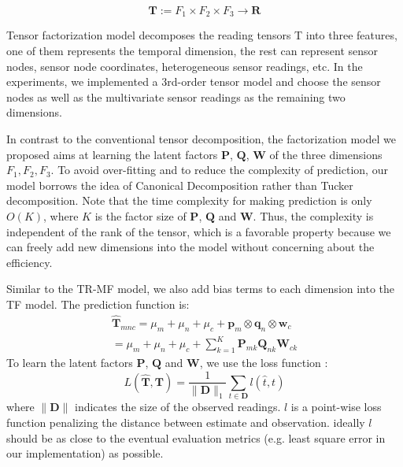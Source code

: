 \begin{equation*}
\mathbf{T} := F_1 \times  F_2 \times F_3 \rightarrow \mathbf{R} 
\end{equation*}

Tensor factorization model decomposes the reading tensors T into three features, one of them represents the temporal dimension, the rest can represent sensor nodes, sensor node coordinates, heterogeneous sensor readings, etc. In the experiments, we implemented a 3rd-order tensor model and choose the sensor nodes as well as the multivariate sensor readings as the remaining two dimensions.

In contrast to the conventional tensor decomposition, the factorization model we proposed aims at learning the latent factors $\mathbf{P}$,  $\mathbf{Q}$, $\mathbf{W}$ of the three dimensions $F_1, F_2, F_3$.
To avoid over-fitting and to reduce the complexity of prediction, our model borrows the idea of Canonical Decomposition rather than Tucker decomposition. Note that the time complexity for making prediction is only $O(K)$, where $K$ is the factor size of $\mathbf{P}$, $\mathbf{Q}$ and $\mathbf{W}$. Thus, the complexity is independent of the rank of the tensor, which is a favorable property because we can freely add new dimensions into the model without concerning about the efficiency.

Similar to the TR-MF model, we also add bias terms to each dimension into the TF model. The prediction function is:
\begin{equation*}
\begin{aligned}
\mathbf{\hat{T}}_{mnc}=\mu_m+\mu_n+\mu_c + \mathbf{p}_m \otimes \mathbf{q}_n\otimes \mathbf{w}_c
\\=\mu_m+\mu_n+\mu_c+\sum\limits_{k=1}^{K}\mathbf{P}_{m k} \mathbf{Q}_{n k} \mathbf{W}_{c k}
\end{aligned}
\end{equation*}
To learn the latent factors $\mathbf{P}$, $\mathbf{Q}$ and $\mathbf{W}$, we use the loss function :
\begin{equation*}
L(\mathbf{\hat{T}},\mathbf{T})=\frac{1}{\|\mathbf{D}\|_1} \sum\limits_{t\in \mathbf{D}}  l(\hat{t},t)
\end{equation*}
where $\|\mathbf{D}\|$ indicates the size of the observed readings.
$l$ is a point-wise loss function penalizing the distance between estimate and observation.
ideally $l$ should be as close to the eventual evaluation metrics (e.g. least square error in our implementation) as possible.

